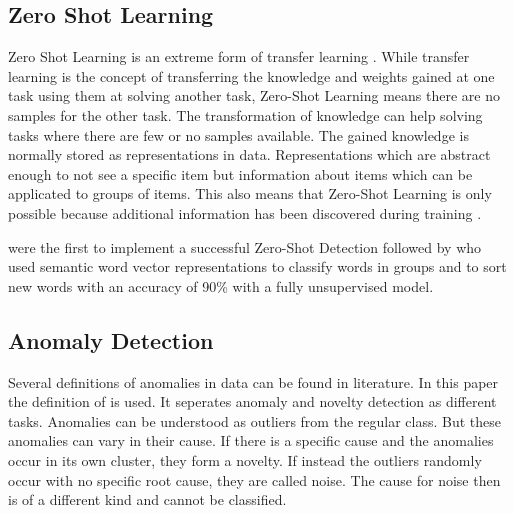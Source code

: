 \subsection{Zero Shot Learning}
Zero Shot Learning is an extreme form of transfer learning . While transfer learning is the concept of transferring the knowledge and weights gained at one task using them at solving another task, Zero-Shot Learning means there are no samples for the other task. The transformation of knowledge can help solving tasks where there are few or no samples available. The gained knowledge is normally stored as representations in data. Representations which are abstract enough to not see a specific item but information about items which can be applicated to groups of items. This also means that Zero-Shot Learning is only possible because additional information has been discovered during training .

 were the first to implement a successful Zero-Shot Detection followed by  who used semantic word vector representations to classify words in groups and to sort new words with an accuracy of 90\% with a fully unsupervised model.
\subsection{Anomaly Detection}
Several definitions of anomalies in data can be found in literature. In this paper the definition of  is used. It seperates anomaly and novelty detection as different tasks. Anomalies can be understood as outliers from the regular class. But these anomalies can vary in their cause. If there is a specific cause and the anomalies occur in its own cluster, they form a novelty. If instead the outliers randomly occur with no specific root cause, they are called noise. The cause for noise then is of a different kind and cannot be classified.


